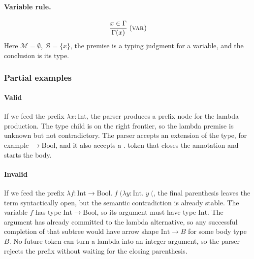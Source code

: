 \paragraph{Variable rule.}
\[
	\frac{x \in \Gamma}{\Gamma(x)} \; (\text{\textsc{var}})
\]
Here $\mathcal{M} = \emptyset$, $\mathcal{B} = \{x\}$, the premise is a typing judgment for a variable, and the conclusion is its type.

\subsubsection{Partial examples}

\paragraph{Valid} If we feed the prefix $\lambda x:\mathrm{Int}$, the parser produces a prefix node for the lambda production. The type child is on the right frontier, so the lambda premise is unknown but not contradictory. The parser accepts an extension of the type, for example $\to \mathrm{Bool}$, and it also accepts a $.$ token that closes the annotation and starts the body.

\paragraph{Invalid} If we feed the prefix $\lambda f:\mathrm{Int}\to\mathrm{Bool}.\; f\;(\lambda y:\mathrm{Int}.\;y\;($, the final parenthesis leaves the term syntactically open, but the semantic contradiction is already stable. The variable $f$ has type $\mathrm{Int}\to\mathrm{Bool}$, so its argument must have type $\mathrm{Int}$. The argument has already committed to the lambda alternative, so any successful completion of that subtree would have arrow shape $\mathrm{Int}\to B$ for some body type $B$. No future token can turn a lambda into an integer argument, so the parser rejects the prefix without waiting for the closing parenthesis.
